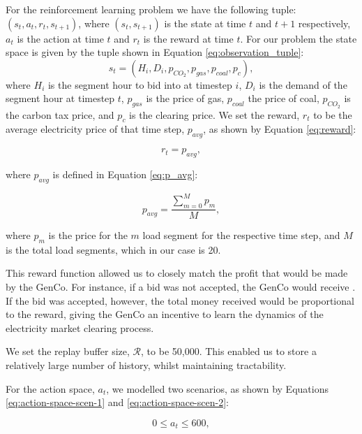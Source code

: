 \documentclass[conference]{IEEEtran}
\begin{document}
For the reinforcement learning problem we have the following tuple: $(s_t,a_t,r_t,s_{t+1})$, where $(s_t, s_{t+1})$ is the state at time $t$ and $t+1$ respectively, $a_t$ is the action at time $t$ and $r_t$ is the reward at time $t$. For our problem the state space is given by the tuple shown in Equation \ref{eq:observation_tuple}:
\begin{equation}
\label{eq:observation_tuple}
	s_t=(H_i,D_i,p_{CO_{2}},p_{gas},p_{coal},p_{c}),
\end{equation}
\noindent where $H_i$ is the segment hour to bid into at timestep $i$, $D_i$ is the demand of the segment hour at timestep $t$, $p_{gas}$ is the price of gas, $p_{coal}$ the price of coal, $p_{CO_{2}}$ is the carbon tax price, and $p_{c}$ is the clearing price. We set the reward, $r_t$ to be the average electricity price of that time step, $p_{avg}$, as shown by Equation \ref{eq:reward}:

\begin{equation}
\label{eq:reward}
	r_t=p_{avg},
\end{equation}

\noindent where $p_{avg}$ is defined in Equation \ref{eq:p_avg}:

\begin{equation}
\label{eq:p_avg}
	p_{avg}=\frac{\sum_{m=0}^{M}p_m}{M},
\end{equation}

\noindent where $p_m$ is the price for the $m$ load segment for the respective time step, and $M$ is the total load segments, which in our case is 20. 

This reward function allowed us to closely match the profit that would be made by the GenCo. For instance, if a bid was not accepted, the GenCo would receive . If the bid was accepted, however, the total money received would be proportional to the reward, giving the GenCo an incentive to learn the dynamics of the electricity market clearing process. 

We set the replay buffer size, $\mathcal{R}$, to be 50,000. This enabled us to store a relatively large number of history, whilst maintaining tractability.

For the action space, $a_t$, we modelled two scenarios, as shown by Equations \ref{eq:action-space-scen-1} and \ref{eq:action-space-scen-2}:

\begin{equation}
\label{eq:action-space-scen-1}
	0 \leq a_t \leq 600,
\end{equation}
\end{document}
